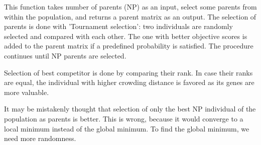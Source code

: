 This function takes number of parents (NP) as an input, select some parents from within the population, and returns a parent matrix as an output. The selection of parents is done with 'Tournament selection': two individuals are randomly selected and compared with each other. The one with better objective scores is added to the parent matrix if a predefined probability is satisfied. The procedure continues until NP parents are selected. 

Selection of best competitor is done by comparing their rank. In case their ranks are equal, the individual with higher crowding distance is favored as its genes are more valuable.

It may be mistakenly thought that selection of only the best NP individual of the population as parents is better. This is wrong, because it would converge to a local minimum instead of the global minimum. To find the global minimum, we need more randomness.


